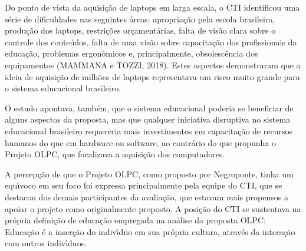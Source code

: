 \documentclass[
12pt,		%
openright,	%
twoside,  %
a4paper,			%
chapter=TITLE,		%
english,			%
french,				%
spanish,			%
brazil				%
]{USPSC-classe/USPSC}
\begin{document}
Do ponto de vista da aquisi\c{c}\~ao de \textquotedbl laptops \textquotedbl  em larga escala, o CTI identificou uma s\'erie de dificuldades nas seguintes \'areas: apropria\c{c}\~ao pela escola brasileira, produ\c{c}\~ao dos laptops, restri\c{c}\~oes or\c{c}ament\'arias, falta de vis\~ao clara sobre o controle dos conte\'udos, falta de uma vis\~ao sobre capacita\c{c}\~ao dos profissionais da educa\c{c}\~ao, problemas ergon\^omicos e, principalmente, obsolesc\^encia dos equipamentos  (MAMMANA e TOZZI, 2018). Estes aspectos demonstraram que a ideia de aquisi\c{c}\~ao de milh\~oes de laptops representava um risco muito grande para o sistema educacional brasileiro.

















O estudo apontava, tamb\'em, que o sistema educacional poderia se beneficiar de alguns aspectos da proposta, mas que qualquer iniciativa disruptiva no sistema educacional brasileiro requereria mais investimentos em capacita\c{c}\~ao de recursos humanos do que em hardware ou software, ao contr\'ario do que propunha o Projeto OLPC, que focalizava a aquisi\c{c}\~ao dos computadores.

















A percep\c{c}\~ao de que o Projeto OLPC, como proposto por Negroponte, tinha um equ\'{\i}voco em seu foco foi expressa principalmente pela equipe do CTI, que se destacou dos demais participantes da avalia\c{c}\~ao, que estavam mais propensos a apoiar o projeto como originalmente proposto. A posi\c{c}\~ao do CTI se sustentava na pr\'opria defini\c{c}\~ao de educa\c{c}\~ao empregada na an\'alise da proposta OLPC: \textquotedbl Educa\c{c}\~ao \'e a inser\c{c}\~ao do indiv\'{\i}duo em sua pr\'opria cultura, atrav\'es da intera\c{c}\~ao com outros indiv\'{\i}duos\textquotedbl .
\end{document}
